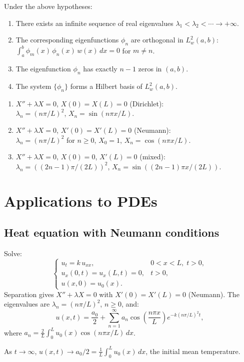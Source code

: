 \begin{theorem}
Under the above hypotheses:
\begin{enumerate}
    \item There exists an infinite sequence of real eigenvalues
          $\lambda_1 < \lambda_2 < \cdots \to +\infty$.
    \item The corresponding eigenfunctions $\phi_n$ are orthogonal in
          $L^2_w(a,b)$:
          $\int_a^b \phi_m(x)\, \phi_n(x)\, w(x)\, dx = 0$ for $m \neq n$.
    \item The eigenfunction $\phi_n$ has exactly $n-1$ zeros in $(a,b)$.
    \item The system $\{\phi_n\}$ forms a Hilbert basis of $L^2_w(a,b)$.
\end{enumerate}
\end{theorem}

\begin{example}
\leavevmode
\begin{enumerate}
    \item $X'' + \lambda X = 0$, $X(0) = X(L) = 0$ (Dirichlet):\\
          $\lambda_n = (n\pi/L)^2$, $X_n = \sin(n\pi x/L)$.
    \item $X'' + \lambda X = 0$, $X'(0) = X'(L) = 0$ (Neumann):\\
          $\lambda_n = (n\pi/L)^2$ for $n \geq 0$, $X_0 = 1$,
          $X_n = \cos(n\pi x/L)$.
    \item $X'' + \lambda X = 0$, $X(0) = 0$, $X'(L) = 0$ (mixed):\\
          $\lambda_n = ((2n-1)\pi/(2L))^2$, $X_n = \sin((2n-1)\pi x/(2L))$.
\end{enumerate}
\end{example}

\section{Applications to PDEs}

\subsection{Heat equation with Neumann conditions}

\begin{example}
Solve:
\[
    \begin{cases}
        u_t = k\, u_{xx}, & 0 < x < L,\; t > 0,\\
        u_x(0,t) = u_x(L,t) = 0, & t > 0,\\
        u(x,0) = u_0(x).
    \end{cases}
\]
Separation gives $X'' + \lambda X = 0$ with $X'(0) = X'(L) = 0$
(Neumann). The eigenvalues are $\lambda_n = (n\pi/L)^2$, $n \geq 0$, and:
\[
    u(x,t) = \frac{a_0}{2} + \sum_{n=1}^{\infty} a_n
    \cos\!\left(\frac{n\pi x}{L}\right) e^{-k(n\pi/L)^2 t},
\]
where $a_n = \frac{2}{L}\int_0^L u_0(x)\cos(n\pi x/L)\, dx$.

As $t \to \infty$, $u(x,t) \to a_0/2 = \frac{1}{L}\int_0^L u_0(x)\, dx$,
the initial mean temperature.
\end{example}

